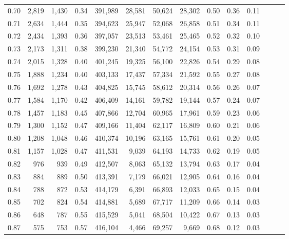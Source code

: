 \begin{tabular}{rrrrrrrrrrrrrr}
0.70 &   2,819 &  1,430 &  0.34 &  391,989 &   28,581 &  50,624 &  28,302 &  0.50 &  0.36 &      0.11 \\
0.71 &   2,634 &  1,444 &  0.35 &  394,623 &   25,947 &  52,068 &  26,858 &  0.51 &  0.34 &      0.11 \\
0.72 &   2,434 &  1,393 &  0.36 &  397,057 &   23,513 &  53,461 &  25,465 &  0.52 &  0.32 &      0.10 \\
0.73 &   2,173 &  1,311 &  0.38 &  399,230 &   21,340 &  54,772 &  24,154 &  0.53 &  0.31 &      0.09 \\
0.74 &   2,015 &  1,328 &  0.40 &  401,245 &   19,325 &  56,100 &  22,826 &  0.54 &  0.29 &      0.08 \\
0.75 &   1,888 &  1,234 &  0.40 &  403,133 &   17,437 &  57,334 &  21,592 &  0.55 &  0.27 &      0.08 \\
0.76 &   1,692 &  1,278 &  0.43 &  404,825 &   15,745 &  58,612 &  20,314 &  0.56 &  0.26 &      0.07 \\
0.77 &   1,584 &  1,170 &  0.42 &  406,409 &   14,161 &  59,782 &  19,144 &  0.57 &  0.24 &      0.07 \\
0.78 &   1,457 &  1,183 &  0.45 &  407,866 &   12,704 &  60,965 &  17,961 &  0.59 &  0.23 &      0.06 \\
0.79 &   1,300 &  1,152 &  0.47 &  409,166 &   11,404 &  62,117 &  16,809 &  0.60 &  0.21 &      0.06 \\
0.80 &   1,208 &  1,048 &  0.46 &  410,374 &   10,196 &  63,165 &  15,761 &  0.61 &  0.20 &      0.05 \\
0.81 &   1,157 &  1,028 &  0.47 &  411,531 &    9,039 &  64,193 &  14,733 &  0.62 &  0.19 &      0.05 \\
0.82 &     976 &    939 &  0.49 &  412,507 &    8,063 &  65,132 &  13,794 &  0.63 &  0.17 &      0.04 \\
0.83 &     884 &    889 &  0.50 &  413,391 &    7,179 &  66,021 &  12,905 &  0.64 &  0.16 &      0.04 \\
0.84 &     788 &    872 &  0.53 &  414,179 &    6,391 &  66,893 &  12,033 &  0.65 &  0.15 &      0.04 \\
0.85 &     702 &    824 &  0.54 &  414,881 &    5,689 &  67,717 &  11,209 &  0.66 &  0.14 &      0.03 \\
0.86 &     648 &    787 &  0.55 &  415,529 &    5,041 &  68,504 &  10,422 &  0.67 &  0.13 &      0.03 \\
0.87 &     575 &    753 &  0.57 &  416,104 &    4,466 &  69,257 &   9,669 &  0.68 &  0.12 &      0.03 \\

\end{tabular}
